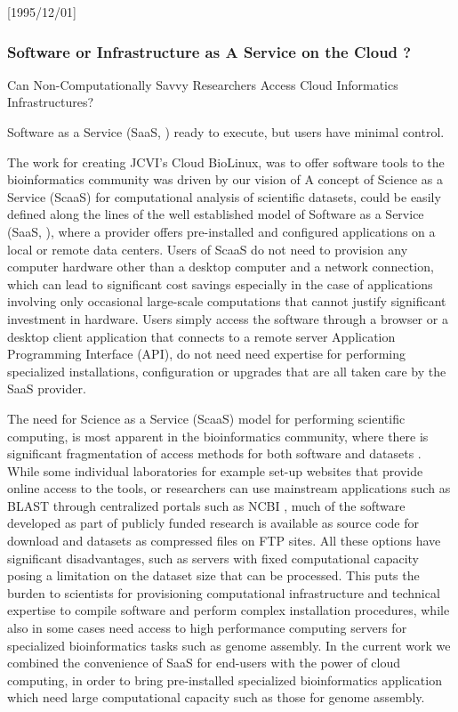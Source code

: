 \NeedsTeXFormat{LaTeX2e}[1995/12/01] \documentclass[10pt]{bmc_article}
\newenvironment{bmcformat}{\begin{raggedright}\baselineskip20pt\sloppy\setboolean{publ}{false}}{\end{raggedright}\baselineskip20pt\sloppy}
\begin{document}
\begin{bmcformat}
\subsubsection*{Software or Infrastructure as A Service on the Cloud ?}

Can Non-Computationally Savvy Researchers Access Cloud Informatics Infrastructures? 


Software as a Service (SaaS, \cite{papazoglou2003}) ready to execute, but users have minimal control.

The work for creating JCVI's Cloud BioLinux, was to offer software tools to the bioinformatics community was driven by our vision of 
A concept of Science as a Service (ScaaS) for computational analysis of scientific datasets, could be easily 
defined along the lines of the well established model of Software as a Service (SaaS, \cite{papazoglou2003}), 
where a provider offers pre-installed and configured applications on a local or remote data centers. Users of 
ScaaS do not need to provision any computer hardware other than a desktop computer and a network connection, 
which can lead to significant cost savings especially in the case of applications involving only occasional 
large-scale computations that cannot justify significant investment in hardware. Users simply access the 
software through a browser or a desktop client application that connects to a remote server Application 
Programming Interface (API), do not need need expertise for performing specialized installations, configuration 
or upgrades that are all taken care by the SaaS provider.  

The need for Science as a Service (ScaaS) model for performing scientific computing, is most apparent in the 
bioinformatics community, where there is significant fragmentation of access methods for both software and datasets 
\cite{stein}. While some individual laboratories for example set-up websites that provide online access to the 
tools, or researchers can use mainstream applications such as BLAST \cite{altchul} through centralized portals
such as NCBI \cite{}, much of the software developed as part of publicly funded research is available as source 
code for download and datasets as compressed files on FTP sites. All these options have significant disadvantages,  
such as servers with fixed computational capacity posing a limitation on the dataset size that can be processed. 
This puts the burden to scientists for provisioning computational infrastructure and technical expertise to compile
software and perform complex installation procedures, while also in some cases need access to high performance computing 
servers for specialized bioinformatics tasks such as genome assembly. In the current work we combined the convenience 
of SaaS for end-users with the power of cloud computing, in order to bring pre-installed specialized bioinformatics application which need large computational capacity such as those for genome assembly.



\end{bmcformat}
\end{document}
